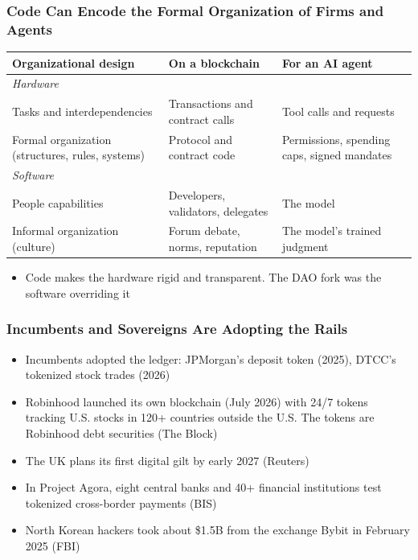 \documentclass[aspectratio=169]{beamer}
\newcommand{\bi}{\begin{itemize}}
\newcommand{\ei}{\end{itemize}}
\newcommand{\m}{\item}
\begin{document}
\begin{frame}[label=appx-org]
\frametitle{Code Can Encode the Formal Organization of Firms and Agents}

\begin{center}
\small
\begin{tabular}{p{} p{} p{}}
\toprule
\textbf{Organizational design} & \textbf{On a blockchain} & \textbf{For an AI agent} \\
\midrule
\multicolumn{3}{l}{\textit{Hardware}} \\
Tasks and interdependencies & Transactions and contract calls & Tool calls and requests \\
Formal organization (structures, rules, systems) & Protocol and contract code & Permissions, spending caps, signed mandates \\
\midrule
\multicolumn{3}{l}{\textit{Software}} \\
People capabilities & Developers, validators, delegates & The model \\
Informal organization (culture) & Forum debate, norms, reputation & The model's trained judgment \\
\bottomrule
\end{tabular}
\end{center}
\bi
\m Code makes the hardware rigid and transparent. The DAO fork was the software overriding it
\ei

\par\vspace{0pt plus 1fill}\hfill{\scriptsize \hyperlink{main-dao}{}}
\end{frame}
\begin{frame}[label=appx-incumbents]
\frametitle{Incumbents and Sovereigns Are Adopting the Rails}

\bi
\m Incumbents adopted the ledger: JPMorgan's deposit token (2025), DTCC's tokenized stock trades (2026)
\m Robinhood launched its own blockchain (July 2026) with 24/7 tokens tracking U.S. stocks in 120+ countries outside the U.S. The tokens are Robinhood debt securities (The Block)
\m The UK plans its first digital gilt by early 2027 (Reuters)
\m In Project Agora, eight central banks and 40+ financial institutions test tokenized cross-border payments (BIS)
\m North Korean hackers took about \$1.5B from the exchange Bybit in February 2025 (FBI)
\ei

\par\vspace{0pt plus 1fill}\hfill{\scriptsize \hyperlink{main-authority}{}}
\end{frame}
\end{document}
